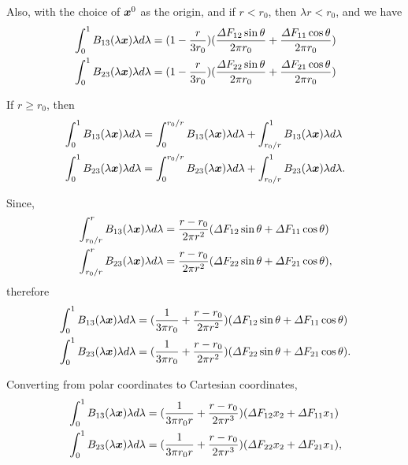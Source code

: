 \documentclass[11pt,letterpaper]{article}
\begin{document}
Also, with the choice of $\bfx^0$ as the origin, and if $r < r_0$, then $\lambda r < r_0$, and we have
\begin{eqnarray*}
&\int_0^1 B_{13}(\lambda \bfx) \lambda d\lambda  = (1-\frac{r}{3r_0}) (\frac{\Delta F_{12} \sin \theta }{2 \pi r_0}+\frac{\Delta F_{11} \cos \theta}{2 \pi r_0} ) \\
&\int_0^1 B_{23}(\lambda \bfx) \lambda d\lambda  = (1-\frac{r}{3r_0}) (\frac{\Delta F_{22} \sin \theta }{2 \pi r_0}+\frac{\Delta F_{21} \cos \theta}{2 \pi r_0} )
\end{eqnarray*}

If $r \ge r_0$, then
\begin{eqnarray*}
&\int_0^1 B_{13}(\lambda \bfx)\lambda d\lambda  = \int_0^{r_0/r} B_{13}(\lambda \bfx)\lambda d\lambda + \int_{r_0/r}^1 B_{13}(\lambda \bfx)\lambda d\lambda \\
&\int_0^1 B_{23}(\lambda \bfx)\lambda d\lambda  = \int_0^{r_0/r} B_{23}(\lambda \bfx)\lambda d\lambda + \int_{r_0/r}^1 B_{23}(\lambda \bfx)\lambda d\lambda.
\end{eqnarray*}

Since,
\begin{eqnarray*}
&\int_{r_0/r}^r B_{13}(\lambda \bfx)\lambda d\lambda  = \frac{r-r_0}{2\pi r^2}(\Delta F_{12} \sin \theta + \Delta F_{11} \cos \theta) \\
&\int_{r_0/r}^r B_{23}(\lambda \bfx)\lambda d\lambda  = \frac{r-r_0}{2\pi r^2}(\Delta F_{22} \sin \theta + \Delta F_{21} \cos \theta),
\end{eqnarray*}
therefore
\begin{eqnarray*}
&\int_0^1 B_{13}(\lambda \bfx) \lambda d\lambda  = (\frac{1}{3\pi r_0}+\frac{r-r_0}{2\pi r^2})(\Delta F_{12} \sin \theta + \Delta F_{11} \cos \theta) \\
&\int_0^1 B_{23}(\lambda \bfx) \lambda d\lambda  = (\frac{1}{3 \pi r_0}+ \frac{r-r_0}{2\pi r^2})(\Delta F_{22} \sin \theta + \Delta F_{21} \cos \theta).
\end{eqnarray*}

Converting from polar coordinates to Cartesian coordinates, 
\begin{eqnarray*}
&\int_0^1 B_{13}(\lambda \bfx) \lambda d\lambda  = (\frac{1}{3\pi r_0 r}+\frac{r-r_0}{2\pi r^3})(\Delta F_{12} x_2 + \Delta F_{11} x_1) \\
&\int_0^1 B_{23}(\lambda \bfx) \lambda d\lambda  = (\frac{1}{3 \pi r_0 r}+ \frac{r-r_0}{2\pi r^3})(\Delta F_{22} x_2 + \Delta F_{21} x_1),
\end{eqnarray*}
  
\end{document}
